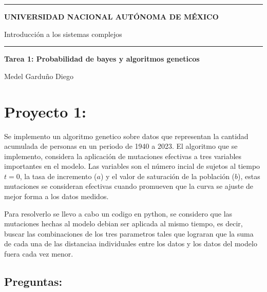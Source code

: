 \documentclass{article}
\begin{document}
\setlength{\parindent}{0pt}

\thispagestyle{plain}


\hrule
\begin{center}
    {\Large \textbf{UNIVERSIDAD NACIONAL AUTÓNOMA DE MÉXICO}}
    \vspace{10pt}

    {\Large{{Introducción a los sistemas complejos}}}
    
    
    \vspace{10pt}

    \hrule

    \vspace{20pt}


    {\Huge \textbf{Tarea 1: Probabilidad de bayes y algoritmos geneticos}}\\
\end{center}

\hdashrule{\linewidth}{1pt}{1mm}

\begin{flushright}
    {\small Medel Garduño Diego} 
\end{flushright}



\section*{Proyecto 1:}


Se implemento un algoritmo genetico sobre datos que representan la cantidad acumulada de personas en un periodo de 1940 a 2023. El algoritmo que se implemento, considera la aplicación de mutaciones efectivas a tres variables importantes en el modelo. Las variables son el número incial de sujetos al tiempo $t = 0$, la tasa de incremento ($a$) y el valor de saturación de la población ($b$), estas mutaciones se consideran efectivas cuando promueven que la curva se ajuste de mejor forma a los datos medidos. 

\vspace{10pt}


Para resolverlo se llevo a cabo un codigo en python, se considero que las mutaciones hechas al modelo debian ser aplicada al mismo tiempo, es decir, buscar las combinaciones de los tres parametros tales que lograran que la suma de cada una de las distanciaa individuales entre los datos y los datos del modelo fuera cada vez menor. 

\subsection*{Preguntas:}
\end{document}
